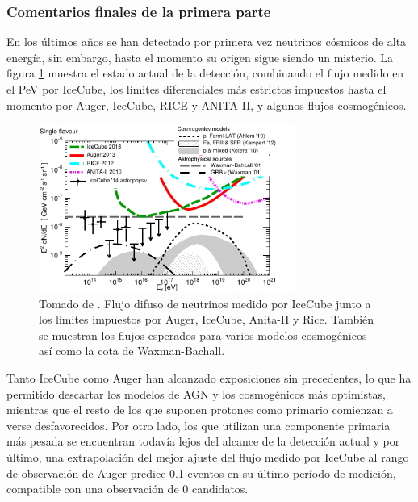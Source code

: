 	\subsubsection{Comentarios finales de la primera parte}
	En los \'ultimos a\~nos se han detectado por primera vez neutrinos c\'osmicos de alta energ\'ia, sin embargo, hasta el momento su origen sigue siendo un misterio.
	La figura \ref{fig:multimess} muestra el estado actual de la detecci\'on, combinando el flujo medido en el PeV por IceCube, los l\'imites diferenciales m\'as estrictos impuestos hasta el momento por Auger, IceCube, RICE y ANITA-II, y algunos flujos cosmog\'enicos.
	\begin{figure}[ht]
		\begin{center}
		\includegraphics[width=0.75\textwidth]{fig/introduccion/1510-02050_multimessenger}
		\caption{\label{fig:multimess} Tomado de \cite{cite:multimess}. Flujo difuso de neutrinos medido por IceCube junto a los l\'imites impuestos por Auger, IceCube, Anita-II y Rice. Tambi\'en se muestran los flujos esperados para varios modelos cosmog\'enicos as\'i como la cota de Waxman-Bachall.}
		\end{center}
	\end{figure}
	
	Tanto IceCube como Auger han alcanzado exposiciones sin precedentes, lo que ha permitido descartar los modelos de AGN y los cosmog\'enicos m\'as optimistas, mientras que el resto de los que suponen protones como primario comienzan a verse desfavorecidos.
	Por otro lado, los que utilizan una componente primaria m\'as pesada se encuentran todav\'ia lejos del alcance de la detecci\'on actual y por \'ultimo, una extrapolaci\'on del mejor ajuste del flujo medido por IceCube al rango de observaci\'on de Auger predice 0.1 eventos en su \'ultimo per\'iodo de medici\'on, compatible con una observaci\'on de 0 candidatos.
	

